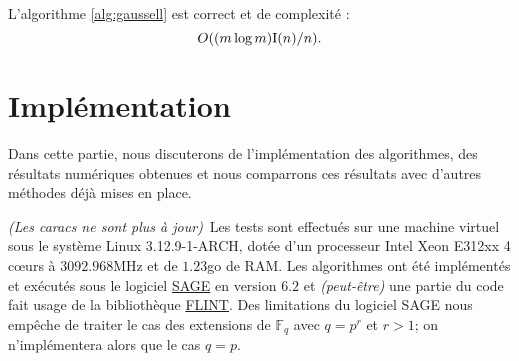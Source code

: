 \documentclass[a4paper]{article} %
\numberwithin{section}{part}
\numberwithin{equation}{section}
\newcommand\GF[1]{\mathbb{F}_{#1}}
\newcommand\I[1]{\textup{I}(#1)}
\begin{document}
\begin{prop}
L'algorithme \ref{alg:gaussell} est correct et de complexité :
\begin{equation}
O((m\,\textup{log\,}m)\I{n}/n).
\end{equation}
\end{prop}


\part{Implémentation}
\label{trois}
Dans cette partie, nous discuterons de l'implémentation des algorithmes, des
résultats numériques obtenues et nous comparrons ces résultats avec d'autres
méthodes déjà mises en place.\par
\emph{(Les caracs ne sont plus à jour)}\,
Les tests sont effectués sur une machine virtuel sous le système Linux 
3.12.9-1-ARCH, dotée d'un processeur Intel Xeon E312xx 4 c\oe urs à 
$3092.968$MHz et de $1.23$go de RAM. Les algorithmes ont été implémentés et 
exécutés sous le logiciel \href{http://www.sagemath.org/}{SAGE} en version 
$6.2$ et \emph{(peut-être)} une partie du code fait usage de la bibliothèque
\href{http://www.flintlib.org/}{FLINT}. Des limitations du logiciel SAGE nous
empêche de traiter le cas des extensions de $\GF{q}$ avec $q = p^r$ et $r>1$; on
n'implémentera alors que le cas $q = p$.
\end{document}
